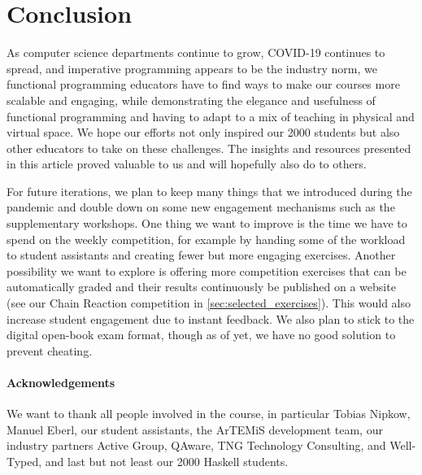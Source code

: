 \section{Conclusion}\label{sec:conclusion}

As computer science departments continue to grow,
COVID-19 continues to spread,
and imperative programming appears to be the industry norm,
we functional programming educators
have to find ways to make our courses more scalable and
engaging, while demonstrating the elegance and usefulness of functional programming and having to adapt to a mix of teaching in physical and virtual space.
We hope our efforts not only inspired our 2000 students
but also other educators to take on these challenges.
The insights and resources presented in this article proved valuable to us and will hopefully also do to others.

For future iterations,
we plan to keep many things that we introduced during the pandemic and double down on some new engagement mechanisms such as the supplementary workshops.
One thing we want to improve is the
time we have to spend on the weekly competition,
for example by handing some of the workload to student assistants and creating fewer but more engaging exercises.
Another possibility we want to explore is offering more
competition exercises that can be automatically graded
and their results continuously be published on a website (see our Chain Reaction competition in \cref{sec:selected_exercises}).
This would also increase student engagement due to instant feedback.
We also plan to stick to the digital open-book exam format,
though as of yet, we have no good solution to prevent cheating.

\paragraph{Acknowledgements}
We want to thank all people involved in the course,
in particular Tobias Nipkow,
Manuel Eberl,
our student assistants,
the ArTEMiS development team,
our industry partners
Active Group,
QAware,
TNG Technology Consulting,
and Well-Typed,
and last but not least our 2000 Haskell students.

